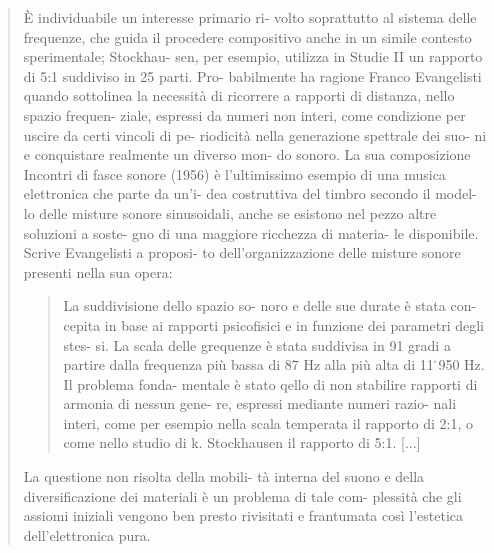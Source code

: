 \begin{quote}
È individuabile un interesse primario ri- volto soprattutto al sistema delle frequenze, che guida il procedere compositivo anche in un simile contesto sperimentale; Stockhau- sen, per esempio, utilizza in Studie II un rapporto di 5:1 suddiviso in 25 parti. Pro- babilmente ha ragione Franco Evangelisti quando sottolinea la necessità di ricorrere a rapporti di distanza, nello spazio frequen- ziale, espressi da numeri non interi, come condizione per uscire da certi vincoli di pe- riodicità nella generazione spettrale dei suo- ni e conquistare realmente un diverso mon- do sonoro. La sua composizione Incontri di fasce sonore (1956) è l’ultimissimo esempio di una musica elettronica che parte da un’i- dea costruttiva del timbro secondo il model- lo delle misture sonore sinusoidali, anche se esistono nel pezzo altre soluzioni a soste- gno di una maggiore ricchezza di materia- le disponibile. Scrive Evangelisti a proposi- to dell’organizzazione delle misture sonore presenti nella sua opera:

\begin{quote}

La suddivisione dello spazio so- noro e delle sue durate è stata con- cepita in base ai rapporti psicofisici e in funzione dei parametri degli stes- si. La scala delle grequenze è stata suddivisa in 91 gradi a partire dalla frequenza più bassa di 87 Hz alla più alta di 11 ̇950 Hz. Il problema fonda- mentale è stato qello di non stabilire rapporti di armonia di nessun gene- re, espressi mediante numeri razio- nali interi, come per esempio nella scala temperata il rapporto di 2:1, o come nello studio di k. Stockhausen il rapporto di 5:1. [...]

\end{quote}

La questione non risolta della mobili- tà interna del suono e della diversificazione dei materiali è un problema di tale com- plessità che gli assiomi iniziali vengono ben presto rivisitati e frantumata così l’estetica dell’elettronica pura.




\end{quote}

